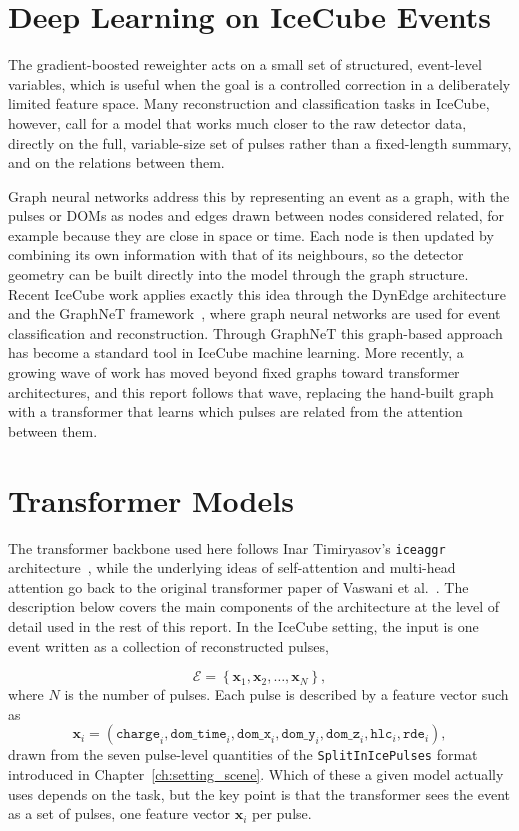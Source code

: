 \section{Deep Learning on IceCube Events}

The gradient-boosted reweighter acts on a small set of structured, event-level variables, which is useful when the goal is a controlled correction in a deliberately limited feature space. Many reconstruction and classification tasks in IceCube, however, call for a model that works much closer to the raw detector data, directly on the full, variable-size set of pulses rather than a fixed-length summary, and on the relations between them.

Graph neural networks address this by representing an event as a graph, with the pulses or DOMs as nodes and edges drawn between nodes considered related, for example because they are close in space or time. Each node is then updated by combining its own information with that of its neighbours, so the detector geometry can be built directly into the model through the graph structure. Recent IceCube work applies exactly this idea through the DynEdge architecture and the GraphNeT framework~\cite{DynEdge2022, GraphNeT2023}, where graph neural networks are used for event classification and reconstruction. Through GraphNeT this graph-based approach has become a standard tool in IceCube machine learning. More recently, a growing wave of work has moved beyond fixed graphs toward transformer architectures, and this report follows that wave, replacing the hand-built graph with a transformer that learns which pulses are related from the attention between them.


\section{Transformer Models}
The transformer backbone used here follows Inar Timiryasov's \texttt{iceaggr} architecture~\cite{TimiryasovIceaggr}, while the underlying ideas of self-attention and multi-head attention go back to the original transformer paper of Vaswani et al.~\cite{Vaswani2017Attention}. The description below covers the main components of the architecture at the level of detail used in the rest of this report. In the IceCube setting, the input is one event written as a collection of reconstructed pulses,

\[
    \mathcal{E}
    =
    \left\{
    \mathbf{x}_1,\mathbf{x}_2,\ldots,\mathbf{x}_N
    \right\},
\]
where \(N\) is the number of pulses. Each pulse is described by a feature vector such as
\[
    \mathbf{x}_i
    =
    \left(
    \texttt{charge}_i,
    \texttt{dom\_time}_i,
    \texttt{dom\_x}_i,
    \texttt{dom\_y}_i,
    \texttt{dom\_z}_i,
    \texttt{hlc}_i,
    \texttt{rde}_i
    \right),
\]
drawn from the seven pulse-level quantities of the \texttt{SplitInIcePulses} format introduced in Chapter~\ref{ch:setting_scene}. Which of these a given model actually uses depends on the task, but the key point is that the transformer sees the event as a set of pulses, one feature vector $\mathbf{x}_i$ per pulse.

